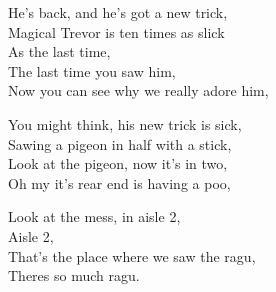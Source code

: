 \vspace{10pt}
He's back, and he's got a new trick,\\
Magical Trevor is ten times as slick\\
As the last time,\\
The last time you saw him,\\
Now you can see why we really adore him,\par
\vspace{10pt}
You might think, his new trick is sick,\\
Sawing a pigeon in half with a stick,\\
Look at the pigeon, now it's in two,\\
Oh my it's rear end is having a poo,\par
\vspace{10pt}
Look at the mess, in aisle 2,\\
Aisle 2,\\
That's the place where we saw the ragu,\\
Theres so much ragu.
